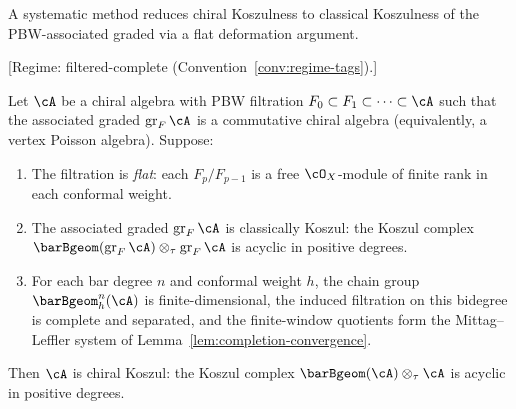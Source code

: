 A systematic method reduces
chiral Koszulness to classical Koszulness of the PBW-associated
graded via a flat deformation argument.

\begin{theorem}
\label{thm:pbw-koszulness-criterion}
\textup{[Regime: filtered-complete
\textup{(}Convention~\textup{\ref{conv:regime-tags})}.]}

Let $\cA$ be a chiral algebra with PBW filtration
$F_0 \subset F_1 \subset \cdots \subset \cA$
such that the associated graded
$\operatorname{gr}_F \cA$ is a commutative chiral algebra
(equivalently, a vertex Poisson algebra).
Suppose:
\begin{enumerate}
\item\label{item:pbw-flat} The filtration is \emph{flat}: each $F_p/F_{p-1}$ is a free
 $\cO_X$-module of finite rank in each conformal weight.
\item\label{item:pbw-classical-koszul} The associated graded $\operatorname{gr}_F \cA$
 is classically Koszul: the Koszul complex
 $\barBgeom(\operatorname{gr}_F \cA) \otimes_\tau \operatorname{gr}_F \cA$
 is acyclic in positive degrees.
\item\label{item:pbw-bounded} For each bar degree $n$ and conformal
 weight $h$, the chain group $\barBgeom^n_h(\cA)$ is finite-dimensional,
 the induced filtration on this bidegree is complete and separated, and
 the finite-window quotients form the Mittag--Leffler system of
 Lemma~\ref{lem:completion-convergence}.
\end{enumerate}
Then $\cA$ is chiral Koszul: the Koszul complex
$\barBgeom(\cA) \otimes_\tau \cA$ is acyclic in positive degrees.
\end{theorem}


